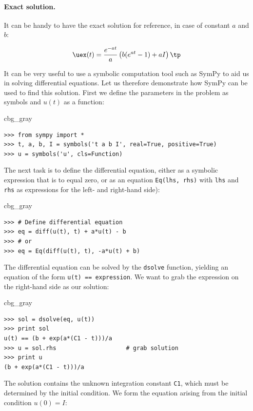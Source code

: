 \documentclass[graybox,envcountchap,sectrefs,final]{svmonodo}
\newenvironment{_cod_tight}[1]{
   \def\FrameCommand{\colorbox{#1}}
   \FrameRule0.6pt\MakeFramed {\FrameRestore}\vskip3mm}
   {\vskip0mm\endMakeFramed}
\newenvironment{cod}[1]{
\bgroup\rmfamily
\fboxsep=0mm\relax
\begin{_cod_tight}{#1}
\list{}{\parsep=-2mm\parskip=0mm\topsep=0pt\leftmargin=2mm
\rightmargin=2\leftmargin\leftmargin=4pt\relax}
\item\relax}
{\endlist\end{_cod_tight}\egroup}
\newenvironment{notice_mdfboxadmon}[1][]{
\begin{notice_mdfboxmdframed}[frametitle=#1]
}
{
\end{notice_mdfboxmdframed}
}
\begin{document}
\paragraph{Exact solution.}
It can be handy to have the exact solution for reference, in case
of constant $a$ and $b$:

\[ \uex(t) = \frac{e^{-at}}{a}\left( b(e^{at}-1) + aI\right)
\tp
\]


\begin{notice_mdfboxadmon}
It can be very useful to use a symbolic computation tool such as SymPy
to aid us in solving differential equations.
Let us therefore demonstrate how SymPy can be used to find this solution.
First we define the parameters in the problem as symbols
and $u(t)$ as a function:

\begin{cod}{cbg_gray}\begin{Verbatim}[numbers=none,fontsize=\fontsize{9pt}{9pt},baselinestretch=0.95,xleftmargin=2mm]
>>> from sympy import *
>>> t, a, b, I = symbols('t a b I', real=True, positive=True)
>>> u = symbols('u', cls=Function)
\end{Verbatim}
\end{cod}
\noindent
The next task is to define the differential equation, either as
a symbolic expression that is to equal zero, or as
an equation \texttt{Eq(lhs, rhs)} with \texttt{lhs} and \texttt{rhs} as expressions for
the left- and right-hand side):

\begin{cod}{cbg_gray}\begin{Verbatim}[numbers=none,fontsize=\fontsize{9pt}{9pt},baselinestretch=0.95,xleftmargin=2mm]
>>> # Define differential equation
>>> eq = diff(u(t), t) + a*u(t) - b
>>> # or
>>> eq = Eq(diff(u(t), t), -a*u(t) + b)
\end{Verbatim}
\end{cod}
\noindent
The differential equation can be solved by the \texttt{dsolve} function, yielding
an equation of the form \texttt{u(t) == expression}. We want to grab the
expression on the right-hand side as our solution:

\begin{cod}{cbg_gray}\begin{Verbatim}[numbers=none,fontsize=\fontsize{9pt}{9pt},baselinestretch=0.95,xleftmargin=2mm]
>>> sol = dsolve(eq, u(t))
>>> print sol
u(t) == (b + exp(a*(C1 - t)))/a
>>> u = sol.rhs                    # grab solution
>>> print u
(b + exp(a*(C1 - t)))/a
\end{Verbatim}
\end{cod}
\noindent
The solution contains the unknown integration constant \texttt{C1}, which must
be determined by the initial condition. We form the equation arising
from the initial condition $u(0)=I$:


\end{notice_mdfboxadmon}
\end{document}
